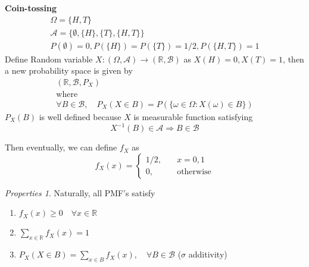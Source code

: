 \documentclass[twoside]{article}
\makeatletter
\theoremstyle{definition}
\theoremstyle{remark}
\newtheorem{properties}[theorem]{Properties}
\theoremstyle{remark}
\newenvironment{example}
 {\patchcmd{\@thm}{\trivlist}{\list{}{\leftmargin=3em \rightmargin=3em}}{}{}%
  \vspace*{10\p@}
  \innerexample\pushQED{\hfill\ensuremath{\Diamond}}}
 {\popQED\endinnerexample}
\makeatother
\begin{document}
\begin{example}
  {\bf Coin-tossing}\\
  \begin{equation*}
    \begin{gathered}
      \Omega = \{ H, T \} \\
      \mathcal{A} = \{ \emptyset, \{H\}, \{T\}, \{H, T\} \} \\
      P(\emptyset) = 0, P(\{H\}) = P(\{T\}) = 1/2, P(\{ H, T \}) = 1
    \end{gathered}
  \end{equation*}
  Define Random variable $X: (\Omega, \mathcal{A}) \rightarrow (\mathbb{R}, \mathcal{B})$
  as $X(H) = 0, X(T) = 1$, then a new probability space is given by
  \begin{equation*}
    \begin{gathered}
      (\mathbb{R}, \mathcal{B}, P_X) \\
      \mathrm{where} \\
      \forall B \in \mathcal{B},\quad
      P_X(X \in B) = P(\{ \omega \in \Omega : X(\omega) \in B \})
    \end{gathered}
  \end{equation*}
  $P_X(B)$ is well defined because $X$ is measurable function satisfying
  \begin{equation*}
    X^{-1}(B) \in \mathcal{A} \Rightarrow B \in \mathcal{B}
  \end{equation*}

  Then eventually, we can define  $f_X$ as
  \begin{equation*}
    f_X(x) = \left\{
    \begin{array}{ll}
      1/2, & \quad x = 0, 1 \\
      0 ,  & \quad \textrm{otherwise}
    \end{array}
    \right.
  \end{equation*}
\end{example}

\begin{properties}
  Naturally, all PMF's satisfy
  \begin{enumerate}
    \item $f_X(x) \geq 0 \quad \forall x \in \mathbb{R}$
    \item $\sum_{x \in \mathbb{R}} f_X(x) = 1$
    \item $P_X(X \in B) = \sum_{x \in B} f_X(x), \quad \forall B \in \mathcal{B}$ ($\sigma$ additivity)
  \end{enumerate}
\end{properties}
\end{document}
